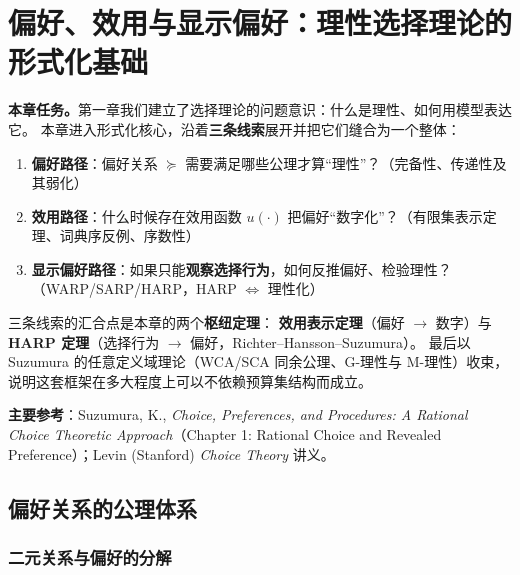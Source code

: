 



\chapter{偏好、效用与显示偏好：理性选择理论的形式化基础}

\noindent\textbf{本章任务。}第一章我们建立了选择理论的问题意识：什么是理性、如何用模型表达它。
本章进入形式化核心，沿着\textbf{三条线索}展开并把它们缝合为一个整体：

\begin{enumerate}
  \item \textbf{偏好路径}：偏好关系 $\succeq$ 需要满足哪些公理才算“理性”？（完备性、传递性及其弱化）
  \item \textbf{效用路径}：什么时候存在效用函数 $u(\cdot)$ 把偏好“数字化”？（有限集表示定理、词典序反例、序数性）
  \item \textbf{显示偏好路径}：如果只能\textbf{观察选择行为}，如何反推偏好、检验理性？（WARP/SARP/HARP，HARP $\Leftrightarrow$ 理性化）
\end{enumerate}

\noindent 三条线索的汇合点是本章的两个\textbf{枢纽定理}：
\textbf{效用表示定理}（偏好 $\to$ 数字）与 \textbf{HARP 定理}（选择行为 $\to$ 偏好，Richter--Hansson--Suzumura）。
最后以 Suzumura 的任意定义域理论（WCA/SCA 同余公理、G-理性与 M-理性）收束，说明这套框架在多大程度上可以不依赖预算集结构而成立。

\medskip
\noindent\textbf{主要参考}：Suzumura, K., \emph{Choice, Preferences, and Procedures: A Rational Choice Theoretic Approach}（Chapter 1: Rational Choice and Revealed Preference）；Levin (Stanford) \emph{Choice Theory} 讲义。

\tableofcontents
\clearpage

\section{偏好关系的公理体系}

\subsection{二元关系与偏好的分解}


